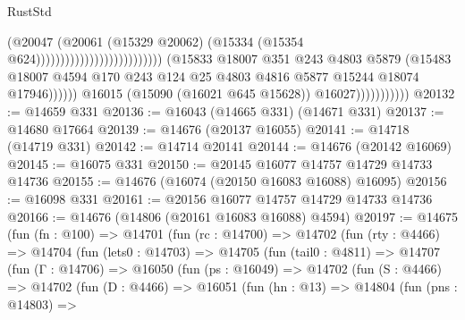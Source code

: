\begin{lexlean}{RustStd}
\begin{coremodule}
                                                                              (@20047
                                                                                (@20061
                                                                                  (@15329 @20062)
                                                                                  (@15334
                                                                                    (@15354
                                                                                      @624))))))))))))))))))))))))))
                                  (@15833
                                    @18007
                                    @351
                                    @243
                                    @4803
                                    @5879
                                    (@15483
                                      @18007
                                      @4594
                                      @170
                                      @243
                                      @124
                                      @25
                                      @4803
                                      @4816
                                      @5877
                                      @15244
                                      @18074
                                      @17946))))))
                          @16015
                          (@15090 (@16021 @645 @15628))
                          @16027)))))))))))
@20132 := @14659 @331
@20136 := @16043 (@14665 @331) (@14671 @331)
@20137 := @14680 @17664
@20139 := @14676 (@20137 @16055)
@20141 := @14718 (@14719 @331)
@20142 := @14714 @20141
@20144 := @14676 (@20142 @16069)
@20145 := @16075 @331
@20150 := @20145 @16077 @14757 @14729 @14733 @14736
@20155 := @14676 (@16074 (@20150 @16083 @16088) @16095)
@20156 := @16098 @331
@20161 := @20156 @16077 @14757 @14729 @14733 @14736
@20166 := @14676 (@14806 (@20161 @16083 @16088) @4594)
@20197 := @14675
    (fun (fn : @100) =>
    @14701
      (fun (rc : @14700) =>
      @14702
        (fun (rty : @4466) =>
        @14704
          (fun (lets0 : @14703) =>
          @14705
            (fun (tail0 : @4811) =>
            @14707
              (fun (Γ : @14706) =>
              @16050
                (fun (ps : @16049) =>
                @14702
                  (fun (S : @4466) =>
                  @14702
                    (fun (D : @4466) =>
                    @16051
                      (fun (hn : @13) =>
                      @14804
                        (fun (pns : @14803) =>

\end{coremodule}
\end{lexlean}
